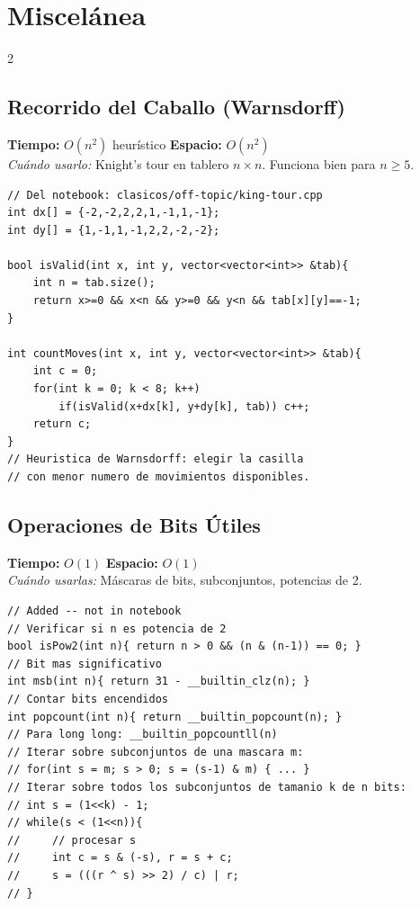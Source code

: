 \documentclass[10pt,a4paper]{article}
\begin{document}
\section{Miscel\'anea}
\begin{multicols}{2}

\subsection{Recorrido del Caballo (Warnsdorff)}
\textbf{Tiempo:} $O(n^2)$ heur\'istico \quad \textbf{Espacio:} $O(n^2)$\\
\textit{Cu\'ando usarlo:} Knight's tour en tablero $n \times n$. Funciona bien para $n \geq 5$.

\begin{lstlisting}
// Del notebook: clasicos/off-topic/king-tour.cpp
int dx[] = {-2,-2,2,2,1,-1,1,-1};
int dy[] = {1,-1,1,-1,2,2,-2,-2};

bool isValid(int x, int y, vector<vector<int>> &tab){
    int n = tab.size();
    return x>=0 && x<n && y>=0 && y<n && tab[x][y]==-1;
}

int countMoves(int x, int y, vector<vector<int>> &tab){
    int c = 0;
    for(int k = 0; k < 8; k++)
        if(isValid(x+dx[k], y+dy[k], tab)) c++;
    return c;
}
// Heuristica de Warnsdorff: elegir la casilla
// con menor numero de movimientos disponibles.
\end{lstlisting}

\subsection{Operaciones de Bits \'Utiles}
\textbf{Tiempo:} $O(1)$ \quad \textbf{Espacio:} $O(1)$\\
\textit{Cu\'ando usarlas:} M\'ascaras de bits, subconjuntos, potencias de 2.

\begin{lstlisting}
// Added -- not in notebook
// Verificar si n es potencia de 2
bool isPow2(int n){ return n > 0 && (n & (n-1)) == 0; }
// Bit mas significativo
int msb(int n){ return 31 - __builtin_clz(n); }
// Contar bits encendidos
int popcount(int n){ return __builtin_popcount(n); }
// Para long long: __builtin_popcountll(n)
// Iterar sobre subconjuntos de una mascara m:
// for(int s = m; s > 0; s = (s-1) & m) { ... }
// Iterar sobre todos los subconjuntos de tamanio k de n bits:
// int s = (1<<k) - 1;
// while(s < (1<<n)){
//     // procesar s
//     int c = s & (-s), r = s + c;
//     s = (((r ^ s) >> 2) / c) | r;
// }
\end{lstlisting}


\end{multicols}
\end{document}
